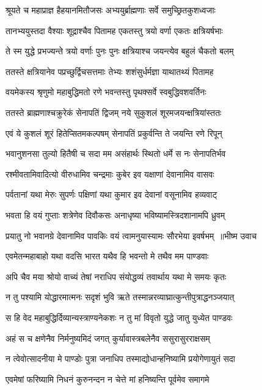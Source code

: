 \twolineshloka
{श्रूयते च महाप्राज्ञ हैहयानमितौजसः}
{अभ्ययुर्ब्राह्मणाः सर्वे समुच्छ्रितकुशध्वजाः}


\twolineshloka
{तानभ्ययुस्तदा वैश्याः शूद्राश्चैव पितामह}
{एकतस्तु त्रयो वर्णा एकतः क्षत्रियर्षभाः}


\twolineshloka
{ते स्म युद्धे प्रभज्यन्ते त्रयो वर्णाः पुनः पुनः}
{क्षत्रियाश्च जयन्त्येव बहुलं चैकतो बलम्}


\twolineshloka
{ततस्ते क्षत्रियानेव पप्रच्छुर्द्विचसत्तमाः}
{तेभ्यः शशंसुर्धर्मज्ञा याथातथ्यं पितामह}


\twolineshloka
{वयमेकस्य श्रृणुमो महाबुद्धिमतो रणे}
{भवन्तस्तु पृथक्सर्वे स्वबुद्धिवशवर्तिनः}


\twolineshloka
{ततस्ते ब्राह्मणाश्चक्रुरेकं सेनापतिं द्विजम्}
{नये सुकुशलं शूरमजयन्क्षत्रियांस्ततः}


\twolineshloka
{एवं ये कुशलं शूरं हितेप्सितमकल्पषम्}
{सेनापतिं प्रकुर्वन्ति ते जयन्ति रणे रिपून्}


\twolineshloka
{भवानुशनसा तुल्यो हितैषी च सदा मम}
{असंहार्थः स्थितो धर्मे स नः सेनापतिर्भव}


\twolineshloka
{रश्मीवतामिवादित्यो वीरुधामिव चन्द्रमाः}
{कुबेर इव यक्षाणां देवानामिव वासवः}


\twolineshloka
{पर्वतानां यथा मेरुः सुपर्णः पक्षिणां यथा}
{कुमार इव देवानां वसूनामिव हव्यवाट्}


\twolineshloka
{भवता हि वयं गुप्ताः शत्रेणेव दिवौकसः}
{अनाधृष्या भविष्यामस्त्रिदशानामपि ध्रुवम्}


\threelineshloka
{प्रयातु नो भवानग्रे देवानामिव पावकिः}
{वयं त्वामनुयास्यामः सौरभेया इवर्षभम् ॥भीष्म उवाच}
{}


\twolineshloka
{एवमेतन्महाबाहो यथा वदसि भारत}
{यथैव हि भवन्तो मे तथैव मम पाण्डवाः}


\twolineshloka
{अपि चैव मया श्रोयो वाच्यं तेषां नराधिप}
{संयोद्धव्यं तवार्थाय यथा मे समयः कृतः}


\twolineshloka
{न तु पश्यामि योद्धारमात्मनः सदृशं भुवि}
{ऋते तस्मान्नरव्याघ्रात्कुन्तीपुत्राद्धनञ्जयात्}


\twolineshloka
{स हि वेद महाबुद्धिर्दिव्यान्यस्त्राण्यनेकशः}
{न तु मां विवृतो युद्धे जातु युध्येत पाण्डवः}


\twolineshloka
{अहं स च क्षणेनैव निर्मनुष्यमिदं जगत्}
{कुर्यावास्त्रबलेनैव ससुरासुरराक्षसम्}


\twolineshloka
{न त्वेवोत्सादनीया मे पाण्डोः पुत्रा जनाधिप}
{तस्माद्योधान्हनिष्यामि प्रयोगेणायुतं सदा}


\twolineshloka
{एवमेषां फरिष्यामि निधनं कुरुनन्दन}
{न चेत्ते मां हनिष्यन्ति पूर्वमेव समागमे}


